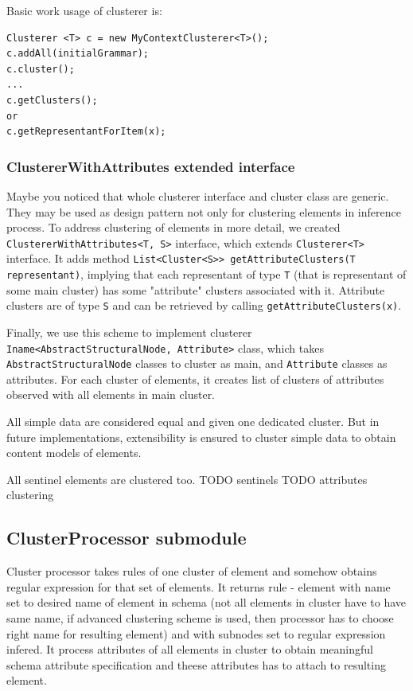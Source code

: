 \documentclass[a4paper,10pt,oneside]{article}
\newcommand{\code}[1]{\texttt{#1}}
\begin{document}
Basic work usage of clusterer is:
\begin{verbatim}
Clusterer <T> c = new MyContextClusterer<T>();
c.addAll(initialGrammar);
c.cluster();
...
c.getClusters();
or
c.getRepresentantForItem(x);
\end{verbatim}

\subsubsection{ClustererWithAttributes extended interface}
Maybe you noticed that whole clusterer interface and cluster class are generic.
They may be used as design pattern not only for clustering elements in inference process.
To address clustering of elements in more detail, we created \code{ClustererWithAttributes<T, S>} interface, which extends \code{Clusterer<T>} interface.
It adds method \code{List<Cluster<S>{}> getAttributeClusters(T representant)}, implying that each representant of
type \code{T} (that is representant of some main cluster) has some "attribute" clusters associated with it.
Attribute clusters are of type \code{S} and can be retrieved by calling \code{getAttributeClusters(x)}.


Finally, we use this scheme to implement clusterer \code{Iname<AbstractStructuralNode, Attribute>} class, which takes \code{AbstractStructuralNode} classes to cluster as main, and \code{Attribute} classes as attributes.
For each cluster of elements, it creates list of clusters of attributes observed with all elements in main cluster.

All simple data are considered equal and given one dedicated cluster.
But in future implementations, extensibility is ensured to cluster simple data to obtain content models of elements.

All sentinel elements are clustered too.
TODO sentinels
TODO attributes clustering

\subsection{ClusterProcessor submodule}
Cluster processor takes rules of one cluster of element and somehow obtains regular expression for that set of elements. It returns rule - element with name set to desired name of element in schema (not all elements in cluster have to have same name, if advanced clustering scheme is used, then processor has to choose right name for  resulting element) and with subnodes set to regular expression infered.
It process attributes of all elements in cluster to obtain meaningful schema attribute specification and theese attributes has to attach to resulting element.
\end{document}
